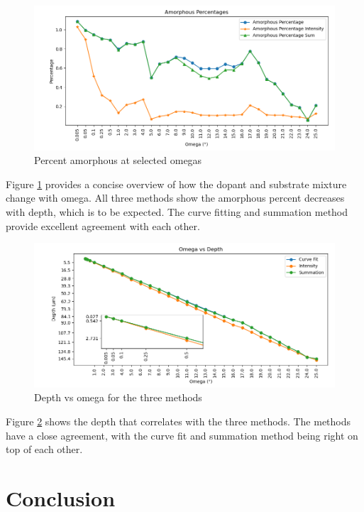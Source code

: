 \documentclass{article}
\begin{document}
    \begin{figure}[H]
        \centering
        \includegraphics[width=.9\linewidth]{Mixture Line Graph (amorphous)_final.png}
        \caption{Percent amorphous at selected omegas}
        \label{fig:line graph amorphous}
    \end{figure}

    Figure \ref{fig:line graph amorphous} provides a concise overview of how the dopant and substrate mixture change with omega. All three methods show the amorphous percent decreases with depth, which is to be expected. The curve fitting and summation method provide excellent agreement with each other.
        
    \begin{figure}[H]
        \centering
        \includegraphics[width=1\linewidth]{Depth vs Omega.png}
        \caption{Depth vs omega for the three methods}
        \label{fig:depth vs omega}
    \end{figure}
    
    Figure \ref{fig:depth vs omega} shows the depth that correlates with the three methods. The methods have a close agreement, with the curve fit and summation method being right on top of each other.

\section{Conclusion}
\end{document}

